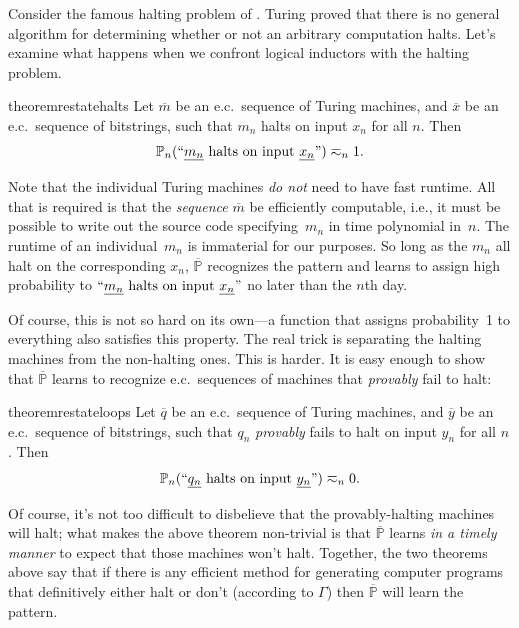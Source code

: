 \documentclass[authordate,onecolumn,noenvironments]{miri-tech-article}
\numberwithin{equation}{subsection}
\newcommand{\quot}[1]{``#1"}
\newcommand{\enc}[1]{{\underline{#1}}}
\newcommand{\seq}[1]{{\overline{#1}}}
\newcommand{\nn}{n}
\newcommand{\ec}[1][\ ]{e.c.#1}
\newcommand{\rparenthetical}[1]{\hfill\upshape{{\small (#1)}}} %
\newcommand{\proofin}[1]{\rparenthetical{Proof in:~#1.}}
\newcommand{\BelState}{\mathbb{P}}
\newcommand{\pt}{\BelState}
\newcommand{\MP}{\seq{\pt}}
\newcommand{\Theory}{\Gamma}
\begin{document}
Consider the famous halting problem of \citet{turing1936computable}. Turing proved that there is no general algorithm for determining whether or not an arbitrary computation halts. Let's examine what happens when we confront logical inductors with the halting problem.

\begin{restatable}{theorem}{restatehalts}\label{thm:halts}
  Let $\seq{m}$ be an \ec sequence of Turing machines, and $\seq{x}$ be an \ec sequence of bitstrings, such that $m_\nn$ halts on input $x_\nn$ for all $\nn$. Then
  \[
    \pt_\nn(\quot{\text{$\enc{m_\nn}$ halts on input $\enc{x_\nn}$}}) \eqsim_\nn 1.
  \]
  \proofin{\ref{app:halts}}
\end{restatable}

Note that the individual Turing machines \emph{do not} need to have fast runtime. All that is required is that the \emph{sequence} $\seq{m}$ be efficiently computable, i.e., it must be possible to write out the source code specifying~$m_\nn$ in time polynomial in~$\nn$. The runtime of an individual~$m_\nn$ is immaterial for our purposes. So long as the $m_\nn$ all halt on the corresponding $x_\nn$, $\MP$ recognizes the pattern and learns to assign high probability to $\quot{\text{$\enc{m_\nn}$ halts on input $\enc{x_\nn}$}}$ no later than the $\nn$th day.

Of course, this is not so hard on its own---a function that assigns probability~1 to everything also satisfies this property. The real trick is separating the halting machines from the non-halting ones. This is harder. It is easy enough to show that $\MP$ learns to recognize \ec sequences of machines that \emph{provably} fail to halt:

\begin{restatable}{theorem}{restateloops}\label{thm:loops}
  Let $\seq{q}$ be an \ec sequence of Turing machines, and $\seq{y}$ be an \ec sequence of bitstrings, such that $q_\nn$ \emph{provably} fails to halt on input $y_\nn$ for all $\nn$. Then
  \[
    \pt_\nn(\quot{\text{$\enc{q_\nn}$ halts on input $\enc{y_\nn}$}}) \eqsim_\nn 0.
  \]
  \proofin{\ref{app:loops}}
\end{restatable}
\noindent Of course, it's not too difficult to disbelieve that the provably-halting machines will halt; what makes the above theorem non-trivial is that $\MP$ learns \emph{in a timely manner} to expect that those machines won't halt. Together, the two theorems above say that if there is any efficient method for generating computer programs that definitively either halt or don't (according to $\Theory$) then $\MP$ will learn the pattern.
\end{document}
